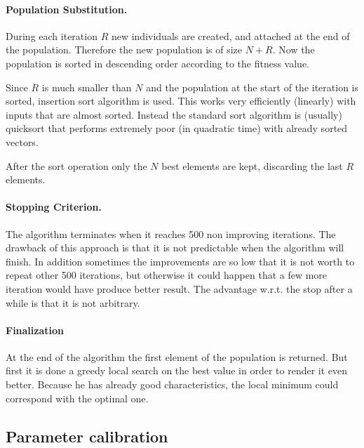 \paragraph{Population Substitution.} During each iteration $R$ new individuals are created,
and attached at the end of the population. Therefore
the new population is of size $N+R$.
Now the population is sorted in descending order according to the fitness value. 

Since $R$ is much smaller than $N$ and the population
at the start of the iteration is sorted, insertion sort algorithm
is used. This works very efficiently (linearly) with inputs that are almost sorted.
Instead the standard sort algorithm is (usually) quicksort that performs extremely poor (in quadratic time) with already sorted vectors.

After the sort operation only the $N$ best elements are kept, discarding the last $R$ elements.

\paragraph{Stopping Criterion.} The algorithm terminates when it reaches 500 non improving iterations.
The drawback of this approach is that it is not predictable when
the algorithm will finish. In addition sometimes the improvements are so low that it is not worth to repeat other 500 iterations, but
otherwise it could happen that a few more iteration would have produce better result.
The advantage w.r.t. the stop after a while is that it is not arbitrary.

\paragraph{Finalization}
At the end of the algorithm the first element of the population is returned. But first it is done
a greedy local search on the best value in order to render it even better.
Because he has already good characteristics, the local minimum could correspond with the optimal one.

\subsection{Parameter calibration}
